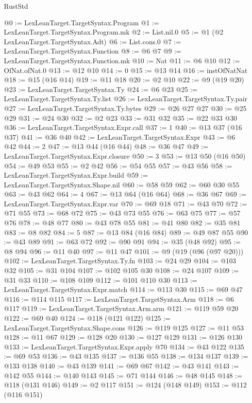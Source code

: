 \begin{lexlean}{RustStd}
\begin{coremodule}
@0 := LexLeanTarget.TargetSyntax.Program
@1 := LexLeanTarget.TargetSyntax.Program.mk
@2 := List.nil.{0}
@5 := @1 (@2 LexLeanTarget.TargetSyntax.Adt)
@6 := List.cons.{0}
@7 := LexLeanTarget.TargetSyntax.Function
@8 := @6 @7
@9 := LexLeanTarget.TargetSyntax.Function.mk
@10 := Nat
@11 := @6 @10
@12 := OfNat.ofNat.{0}
@13 := @12 @10
@14 := 0
@15 := @13 @14
@16 := instOfNatNat
@18 := @15 (@16 @14)
@19 := @11 @18
@20 := @2 @10
@22 := @9 (@19 @20)
@23 := LexLeanTarget.TargetSyntax.Ty
@24 := @6 @23
@25 := LexLeanTarget.TargetSyntax.Ty.list
@26 := LexLeanTarget.TargetSyntax.Ty.pair
@27 := LexLeanTarget.TargetSyntax.Ty.bytes
@29 := @26 @27 @27
@30 := @25 @29
@31 := @24 @30
@32 := @2 @23
@33 := @31 @32
@35 := @22 @33 @30
@36 := LexLeanTarget.TargetSyntax.Expr.call
@37 := 1
@40 := @13 @37 (@16 @37)
@41 := @36 @40
@42 := LexLeanTarget.TargetSyntax.Expr
@43 := @6 @42
@44 := 2
@47 := @13 @44 (@16 @44)
@48 := @36 @47
@49 := LexLeanTarget.TargetSyntax.Expr.closure
@50 := 3
@53 := @13 @50 (@16 @50)
@54 := @49 @53
@55 := @2 @42
@56 := @54 @55
@57 := @43 @56
@58 := LexLeanTarget.TargetSyntax.Expr.build
@59 := LexLeanTarget.TargetSyntax.Shape.nil
@60 := @58 @59
@62 := @60 @30 @55
@63 := @43 @62
@64 := 4
@67 := @13 @64 (@16 @64)
@68 := @36 @67
@69 := LexLeanTarget.TargetSyntax.Expr.var
@70 := @69 @18
@71 := @43 @70
@72 := @71 @55
@73 := @68 @72
@75 := @43 @73 @55
@76 := @63 @75
@77 := @57 @76
@78 := @48 @77
@80 := @43 @78 @55
@81 := @41 @80
@82 := @35 @81
@83 := @8 @82
@84 := 5
@87 := @13 @84 (@16 @84)
@89 := @49 @87 @55
@90 := @43 @89
@91 := @63 @72
@92 := @90 @91
@94 := @35 (@48 @92)
@95 := @8 @94
@96 := @11 @40
@97 := @11 @47
@101 := @9 (@19 (@96 (@97 @20)))
@102 := LexLeanTarget.TargetSyntax.Ty.fn
@103 := @24 @29
@104 := @103 @32
@105 := @31 @104
@107 := @102 @105 @30
@108 := @24 @107
@109 := @31 @33
@110 := @108 @109
@112 := @101 @110 @30
@113 := LexLeanTarget.TargetSyntax.Expr.match
@114 := @113 @30
@115 := @69 @47
@116 := @114 @115
@117 := LexLeanTarget.TargetSyntax.Arm
@118 := @6 @117
@119 := LexLeanTarget.TargetSyntax.Arm.arm
@121 := @119 @59 @20
@122 := @69 @40
@124 := @118 (@121 @122)
@125 := LexLeanTarget.TargetSyntax.Shape.cons
@126 := @119 @125
@127 := @11 @53
@128 := @11 @67
@129 := @128 @20
@130 := @127 @129
@131 := @126 @130
@133 := LexLeanTarget.TargetSyntax.Expr.apply @70
@134 := @43 @122
@135 := @69 @53
@136 := @43 @135
@137 := @136 @55
@138 := @134 @137
@139 := @133 @138
@140 := @43 @139
@141 := @69 @67
@142 := @43 @141
@143 := @142 @55
@144 := @140 @143
@145 := @71 @144
@146 := @48 @145
@148 := @118 (@131 @146)
@149 := @2 @117
@151 := @124 (@148 @149)
@153 := @112 (@116 @151)

\end{coremodule}
\end{lexlean}

